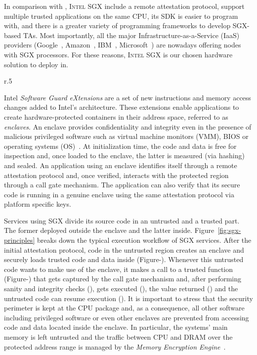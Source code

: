 In comparison with \arm \tz, \textsc{Intel SGX} include a remote attestation protocol, support multiple trusted applications on the same CPU, its SDK is easier to program with, and there is a greater variety of programming frameworks to develop SGX-based TAs.
Most importantly, all the major Infrastructure-as-a-Service (IaaS) providers (Google~\cite{gceskylake}, Amazon~\cite{amazonskylake}, IBM~\cite{ibm-sgx}, Microsoft~\cite{azureconfidential}) are nowadays offering nodes with SGX processors.
For these reasons, \textsc{Intel SGX} is our chosen hardware solution to deploy \projName in.
\begin{wrapfigure}{r}{.5\textwidth}
    \centering
    
    \caption{\textsc{Intel SGX} execution workflow.\label{fig:sgx-principles}}
\end{wrapfigure}
Intel \textit{Software Guard eXtensions} are a set of new instructions and memory access changes added to Intel's architecture.
These extensions enable applications to create hardware-protected containers in their address space, referred to as \emph{enclaves}.
An enclave provides confidentiality and integrity even in the presence of malicious privileged software such as virtual machine monitors (VMM), BIOS or operating systems (OS)~\cite{McKeen2013}. 
At initialization time, the code and data is free for inspection and, once loaded to the enclave, the latter is measured (via hashing) and sealed. 
An application using an enclave identifies itself through a remote attestation protocol and, once verified, interacts with the protected region through a call gate mechanism.
The application can also verify that its secure code is running in a genuine enclave using the same attestation protocol via platform specific keys. %

Services using SGX divide its source code in an untrusted and a trusted part.
The former deployed outside the enclave and the latter inside.
Figure~\ref{fig:sgx-principles} breaks down the typical execution workflow of SGX services.
After the initial attestation protocol, code in the untrusted region creates an enclave and securely loads trusted code and data inside (Figure-). 
Whenever this untrusted code wants to make use of the enclave, it makes a call to a trusted function (Figure-) that gets captured by the call gate mechanism and, after performing sanity and integrity checks (), gets executed (), the value returned () and the untrusted code can resume execution ().
It is important to stress that the security perimeter is kept at the CPU package and, as a consequence, all other software including privileged software or even other enclaves are prevented from accessing code and data located inside the enclave. 
In particular, the systems' main memory is left untrusted and the traffic between CPU and DRAM over the protected address range is managed by the \textit{Memory Encryption Engine}~\cite{Gueron16}.

